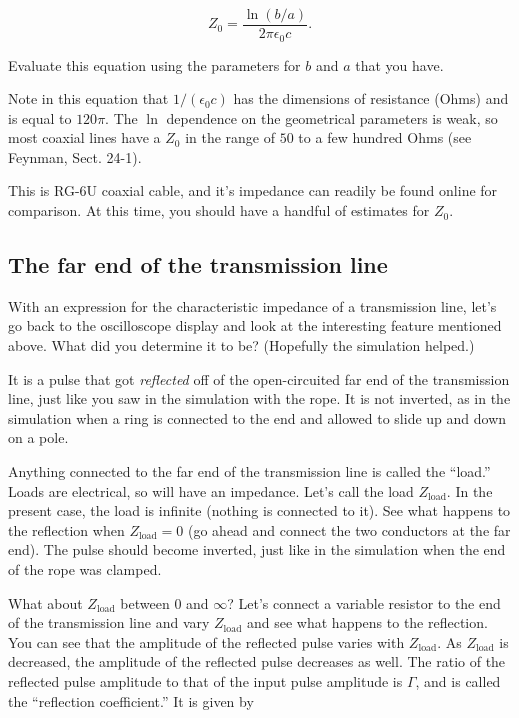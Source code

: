 \documentclass[12pt]{article}
\begin{document}
\begin{equation}
Z_0=\frac{\ln(b/a)}{2\pi\epsilon_0 c}.
\end{equation}

Evaluate this equation using the parameters for $b$ and $a$ that you have.  

Note in this equation that $1/(\epsilon_0 c)$ has the dimensions of resistance (Ohms) and is equal to $120\pi$. The $\ln$ dependence on the geometrical parameters is weak, so most coaxial lines have a $Z_0$ in the range of $50$ to a few hundred Ohms (see Feynman, Sect. 24-1).


This is RG-6U coaxial cable, and it's impedance can readily be found online for comparison. At this time, you should have a handful of estimates for $Z_0$. 

\subsection{The far end of the transmission line}

With an expression for the characteristic impedance of a transmission line, let's go back to the oscilloscope display and look at the interesting feature mentioned above. What did you determine it to be? (Hopefully the simulation helped.)

It is a pulse that got {\sl reflected} off of the open-circuited far end of the transmission line, just like you saw in the simulation with the rope. It is not inverted, as in the simulation when a ring is connected to the end and allowed to slide up and down on a pole.  

Anything connected to the far end of the transmission line is called the ``load.'' Loads are electrical, so will have an impedance. Let's call the load $Z_\text{load}$.  In the present case, the load is infinite (nothing is connected to it).  See what happens to the reflection when $Z_\text{load}=0$ (go ahead and connect the two conductors at the far end). The pulse should become inverted, just like in the simulation when the end of the rope was clamped.

What about $Z_\text{load}$ between $0$ and $\infty$?  Let's connect a variable resistor to the end of the transmission line and vary $Z_\text{load}$ and see what happens to the reflection. You can see that the amplitude of the reflected pulse varies with $Z_\text{load}$. As $Z_\text{load}$ is decreased, the amplitude of the reflected pulse decreases as well. The ratio of the reflected pulse amplitude to that of the input pulse amplitude is $\Gamma$, and is called the ``reflection coefficient.'' It is given by
\end{document}
